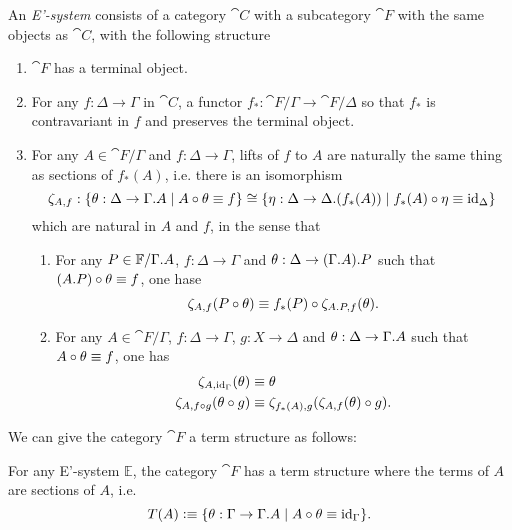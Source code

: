 \begin{defn}
An \emph{E'-system} consists of a category $\cat{C}$ with a subcategory $\cat{F}$ with the
same objects as $\cat{C}$, with
the following structure
\begin{enumerate}
\item $\cat{F}$ has a terminal object.
\item For any $f:\Delta\to\Gamma$ in $\cat{C}$, a functor $f_\ast:\cat{F}/\Gamma\to
\cat{F}/\Delta$ %
so that $f_\ast$ is contravariant in $f$ and preserves the terminal object. 
\item For any $A\in\cat{F}/\Gamma$ and $f:\Delta\to\Gamma$, lifts of
$f$ to $A$ are naturally the same thing as sections of
$f_\ast(A)$, i.e. there is an isomorphism
\begin{equation*}
\zeta_{A,f}%
:\{\theta:\Delta\to\ctxext{\Gamma}{A}\mid A\circ\theta\jdeq f\}
  \cong
\{\eta:\Delta\to\ctxext{\Delta}{(f_\ast(A))}\mid f_\ast(A)\circ\eta\jdeq\catid{\Delta}\}
\end{equation*}
which are natural in $A$ and $f$, in the sense that
\begin{enumerate}
\item For any $P\in\cat{F}/\ctxext{\Gamma}{A}$, $f:\Delta\to\Gamma$ and
$\theta:\Delta\to\ctxext{{\Gamma}{A}}{P}$ such that $(\ctxext{A}{P})\circ\theta\jdeq f$,
one hase
\begin{equation*}
\zeta_{A,f}(P\circ\theta)\jdeq f_\ast(P)\circ \zeta_{\ctxext{A}{P},f}(\theta).
\end{equation*}
\item For any $A\in\cat{F}/\Gamma$, $f:\Delta\to\Gamma$, $g:X\to\Delta$
and $\theta:\Delta\to\ctxext{\Gamma}{A}$ such that $A\circ\theta\equiv f$, one
has
\begin{align*}
\zeta_{A,{\mathrm{id}_{\Gamma}}}(\theta) & \equiv \theta \\
\zeta_{A,f\circ g}(\theta\circ g) & \equiv\zeta_{f_\ast(A),g}(\zeta_{A,f}(\theta)\circ g).
\end{align*}
\end{enumerate}
\end{enumerate}
\end{defn}

We can give the category $\cat{F}$ a term structure as follows:

\begin{defn}
For any E'-system $\mathbb{E}$, the category $\cat{F}$ has a term structure
where the terms of $A$ are sections of $A$, i.e.
\begin{equation*}
T(A)\defeq\{\theta:\Gamma\to\ctxext{\Gamma}{A}\mid A\circ\theta\jdeq\catid{\Gamma}\}.
\end{equation*}
\end{defn}

